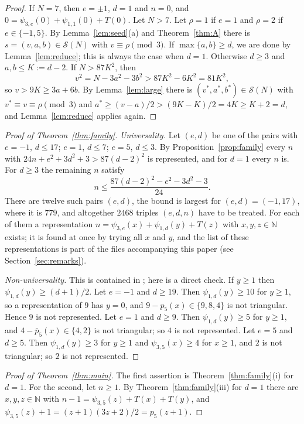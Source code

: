\documentclass[11pt]{amsart}
\theoremstyle{definition}
\theoremstyle{remark}
\newcommand{\N}{\mathbb{N}}
\newcommand{\cS}{\mathcal{S}}
\newcommand{\pb}{\bar p_5}
\newcommand{\Tr}{T}
\begin{document}
\begin{proof}
If $N=7$, then $e=\pm1$, $d=1$ and $n=0$, and $0=\psi_{3,e}(0)+\psi_{1,1}(0)+\Tr(0)$. Let $N>7$.
Let $\rho=1$ if $e=1$ and $\rho=2$ if $e\in\{-1,5\}$.
By Lemma~\ref{lem:seed}(a) and Theorem~\ref{thm:A} there is $s=(v,a,b)\in\cS(N)$ with $v\equiv \rho\pmod 3$.
If $\max\{a,b\}\ge d$, we are done by Lemma~\ref{lem:reduce}; this is always the case when $d=1$.
Otherwise $d\ge 3$ and $a,b\le K:=d-2$. If $N>87K^2$, then
\[
v^2=N-3a^2-3b^2>87K^2-6K^2=81K^2 ,
\]
so $v>9K\ge 3a+6b$. By Lemma~\ref{lem:large} there is $(v^*,a^*,b^*)\in\cS(N)$ with $v^*\equiv v\equiv \rho\pmod 3$ and
$a^*\ge (v-a)/2>(9K-K)/2=4K\ge K+2=d$, and Lemma~\ref{lem:reduce} applies again.
\end{proof}

\begin{proof}[Proof of Theorem~\ref{thm:family}]
\emph{Universality.} Let $(e,d)$ be one of the pairs with $e=-1$, $d\le 17$; $e=1$, $d\le 7$; $e=5$, $d\le 3$.
By Proposition~\ref{prop:family} every $n$ with $24n+e^2+3d^2+3>87(d-2)^2$ is represented, and for $d=1$ every $n$ is.
For $d\ge 3$ the remaining $n$ satisfy
\[
n\le \frac{87(d-2)^2-e^2-3d^2-3}{24}.
\]
There are twelve such pairs $(e,d)$, the bound is largest for $(e,d)=(-1,17)$, where it is $779$, and altogether $2468$ triples $(e,d,n)$ have to be treated.
For each of them a representation $n=\psi_{3,e}(x)+\psi_{1,d}(y)+\Tr(z)$ with $x,y,z\in\N$ exists; it is found at once by trying all $x$ and $y$,
and the list of these representations is part of the files accompanying this paper (see Section~\ref{sec:remarks}).

\emph{Non-universality.} This is contained in \cite[Theorem~1.4(ii)]{S20}; here is a direct check.
If $y\ge 1$ then $\psi_{1,d}(y)\ge (d+1)/2$.
Let $e=-1$ and $d\ge 19$. Then $\psi_{1,d}(y)\ge 10$ for $y\ge 1$, so a representation of $9$ has $y=0$, and
$9-p_5(x)\in\{9,8,4\}$ is not triangular. Hence $9$ is not represented.
Let $e=1$ and $d\ge 9$. Then $\psi_{1,d}(y)\ge 5$ for $y\ge 1$, and $4-\pb(x)\in\{4,2\}$ is not triangular; so $4$ is not represented.
Let $e=5$ and $d\ge 5$. Then $\psi_{1,d}(y)\ge 3$ for $y\ge 1$ and $\psi_{3,5}(x)\ge 4$ for $x\ge 1$, and $2$ is not triangular; so $2$ is not represented.
\end{proof}

\begin{proof}[Proof of Theorem~\ref{thm:main}]
The first assertion is Theorem~\ref{thm:family}(i) for $d=1$.
For the second, let $n\ge 1$. By Theorem~\ref{thm:family}(iii) for $d=1$ there are $x,y,z\in\N$ with
$n-1=\psi_{3,5}(z)+\Tr(x)+\Tr(y)$, and $\psi_{3,5}(z)+1=(z+1)(3z+2)/2=p_5(z+1)$.
\end{proof}
\end{document}
